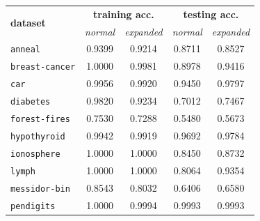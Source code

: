 \documentclass[12pt]{report}
\theoremstyle{definition}
\theoremstyle{definition}
\theoremstyle{definition}
\begin{document}
\begin{table}[ht]
    \centering
    \begin{tabular}{lcccc}
    \hline
    \multicolumn{1}{l}{\multirow{2}{*}{\bf dataset}} & \multicolumn{2}{c}{\bf training acc.} & \multicolumn{2}{c}{\bf testing acc.} \\
    \multicolumn{1}{l}{} & \multicolumn{1}{p{2cm}}{\centering \it normal} & \multicolumn{1}{p{2cm}}{\centering \it expanded} & \multicolumn{1}{p{2cm}}{\centering \it normal} & \multicolumn{1}{p{2cm}}{\centering \it expanded} \\
    \hline
    \multicolumn{1}{l}{\tt anneal}        & \multicolumn{1}{c}{0.9399} & \multicolumn{1}{c}{0.9214} & \multicolumn{1}{c}{0.8711} & \multicolumn{1}{c}{0.8527} \\
    \multicolumn{1}{l}{\tt breast-cancer} & \multicolumn{1}{c}{1.0000} & \multicolumn{1}{c}{0.9981} & \multicolumn{1}{c}{0.8978} & \multicolumn{1}{c}{0.9416} \\
    \multicolumn{1}{l}{\tt car}           & \multicolumn{1}{c}{0.9956} & \multicolumn{1}{c}{0.9920} & \multicolumn{1}{c}{0.9450} & \multicolumn{1}{c}{0.9797} \\
    \multicolumn{1}{l}{\tt diabetes}      & \multicolumn{1}{c}{0.9820} & \multicolumn{1}{c}{0.9234} & \multicolumn{1}{c}{0.7012} & \multicolumn{1}{c}{0.7467} \\
    \multicolumn{1}{l}{\tt forest-fires}  & \multicolumn{1}{c}{0.7530} & \multicolumn{1}{c}{0.7288} & \multicolumn{1}{c}{0.5480} & \multicolumn{1}{c}{0.5673} \\
    \multicolumn{1}{l}{\tt hypothyroid}   & \multicolumn{1}{c}{0.9942} & \multicolumn{1}{c}{0.9919} & \multicolumn{1}{c}{0.9692} & \multicolumn{1}{c}{0.9784} \\
    \multicolumn{1}{l}{\tt ionosphere}    & \multicolumn{1}{c}{1.0000} & \multicolumn{1}{c}{1.0000} & \multicolumn{1}{c}{0.8450} & \multicolumn{1}{c}{0.8732} \\
    \multicolumn{1}{l}{\tt lymph}         & \multicolumn{1}{c}{1.0000} & \multicolumn{1}{c}{1.0000} & \multicolumn{1}{c}{0.8064} & \multicolumn{1}{c}{0.9354} \\
    \multicolumn{1}{l}{\tt messidor-bin}  & \multicolumn{1}{c}{0.8543} & \multicolumn{1}{c}{0.8032} & \multicolumn{1}{c}{0.6406} & \multicolumn{1}{c}{0.6580} \\
    \multicolumn{1}{l}{\tt pendigits}     & \multicolumn{1}{c}{1.0000} & \multicolumn{1}{c}{0.9994} & \multicolumn{1}{c}{0.9993} & \multicolumn{1}{c}{0.9993} \\

\end{tabular}
\end{table}
\end{document}
